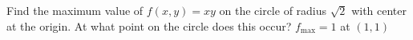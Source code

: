 {Find the maximum value of $f(x,y) = xy$ on the circle of radius $\sqrt{2}$ with center at the origin. At what point on the circle does this occur?
}
{$f_{\text{max}}=1$ at $(1,1)$}